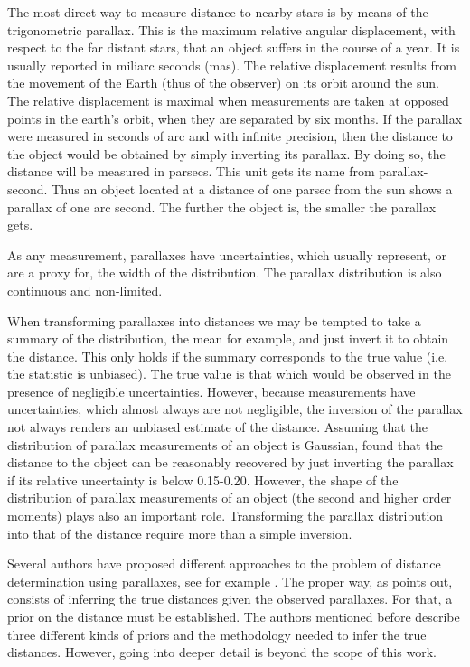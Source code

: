 The most direct way to measure distance to nearby stars is by means of the trigonometric parallax. This is the maximum relative angular displacement, with respect to the far distant stars, that an object suffers in the course of a year. {It is usually reported in miliarc seconds (mas)}. The relative displacement results from the movement of the Earth (thus of the observer) on its orbit around the sun. The relative displacement is maximal when measurements are taken at opposed points in the earth's orbit, when they are separated by six months. If the parallax were measured in seconds of arc and with infinite precision, then the distance to the object would be obtained by simply inverting its parallax. By doing so, the distance will be measured in parsecs. This unit gets its name from parallax-second. Thus an object located at a distance of one parsec from the sun shows a parallax of one arc second. The further the object is, the smaller the parallax gets.

As any measurement, parallaxes have uncertainties, which usually represent, or are a proxy for, the width of the distribution. {The parallax distribution is also continuous and non-limited}. 

When transforming parallaxes into distances we may be tempted to take a summary of the distribution, the mean for example, and just invert it to obtain the distance. This only holds if the summary corresponds to the true value (i.e. the statistic is unbiased). {The true value is that which would be observed in the presence of negligible uncertainties}. However, because measurements have uncertainties, which almost always are not negligible, the inversion of the parallax not always renders an unbiased estimate of the distance. {Assuming that the distribution of parallax measurements of an object is Gaussian, \citet{Lutz1973} found that the distance to the object can be reasonably recovered by just inverting the parallax if its relative uncertainty is below 0.15-0.20. However, the shape of the distribution of parallax measurements of an object (the second and higher order moments) plays also an important role. Transforming the parallax distribution into that of the distance require more than a simple inversion.}  

Several authors have proposed different approaches to the problem of distance determination using parallaxes, see for example \citet{Lutz1973,2015PASP..127..994B,2016ApJ...832..137A,2016ApJ...833..119A}. The proper way, as \citet{2015PASP..127..994B} points out, consists of inferring the true distances given the observed parallaxes. For that, a prior on the distance must be established. The authors mentioned before describe three different kinds of priors and the methodology needed to infer the true distances. However, going into deeper detail is beyond the scope of this work.

